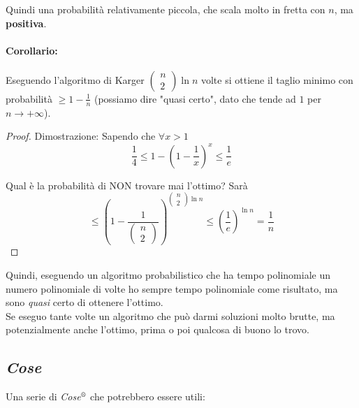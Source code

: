 Quindi una probabilità relativamente piccola, che scala molto in fretta con $n$, ma \textbf{positiva}.\\

\newpage

\paragraph{Corollario:} Eseguendo l'algoritmo di Karger $\left(\begin{array}{c} n \\ 2 \end{array}\right) \ln n$ volte si ottiene il taglio minimo con probabilità $\geq 1 - \frac{1}{n}$ (possiamo dire "quasi certo", dato che tende ad $1$ per $n \rightarrow +\infty$).\\

\begin{proof}
	Dimostrazione: Sapendo che $\forall x >1$
	$$ \frac{1}{4} \leq1 - \left( 1 - \frac{1}{x}\right)^x \leq \frac{1}{e}$$
	
	Qual è la probabilità di NON trovare mai l'ottimo? Sarà
	$$ \leq \left(1 - \frac{1}{\left(\begin{array}{c} n \\ 2 \end{array}\right)}\right)^{\left(\begin{array}{c} n \\ 2 \end{array}\right) \ln n} 
	\leq \left(\frac{1}{e}\right)^{\ln n} 
	= \frac{1}{n}
	$$
\end{proof}

Quindi, eseguendo un algoritmo probabilistico che ha tempo polinomiale un numero polinomiale di volte ho sempre tempo polinomiale come risultato, ma sono \textit{quasi} certo di ottenere l'ottimo.\\

Se eseguo tante volte un algoritmo che può darmi soluzioni molto brutte, ma potenzialmente anche l'ottimo, prima o poi qualcosa di buono lo trovo.\\


\newpage

\subsection*{\textit{Cose}}

Una serie di \textit{Cose}$^\text{\textregistered}$ che potrebbero essere utili: 

